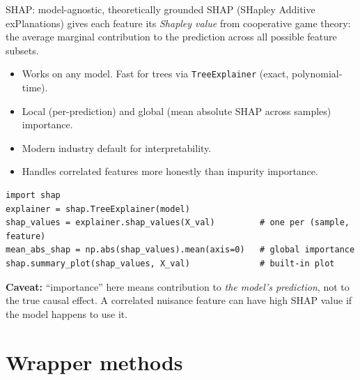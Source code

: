 \documentclass[aspectratio=169]{beamer}
\begin{document}
\begin{frame}[fragile]{SHAP: model-agnostic, theoretically grounded}
  SHAP (SHapley Additive exPlanations) gives each feature its \emph{Shapley value} from cooperative game theory: the average marginal contribution to the prediction across all possible feature subsets.
  \vfill
  \begin{itemize}\small
    \item Works on any model. Fast for trees via \texttt{TreeExplainer} (exact, polynomial-time).
    \item Local (per-prediction) and global (mean absolute SHAP across samples) importance.
    \item Modern industry default for interpretability.
    \item Handles correlated features more honestly than impurity importance.
  \end{itemize}
  \vfill
{\lstset{basicstyle=\ttfamily\scriptsize}
\begin{lstlisting}
import shap
explainer = shap.TreeExplainer(model)
shap_values = explainer.shap_values(X_val)         # one per (sample, feature)
mean_abs_shap = np.abs(shap_values).mean(axis=0)   # global importance
shap.summary_plot(shap_values, X_val)              # built-in plot
\end{lstlisting}}
  \vfill
  \footnotesize \textbf{Caveat:} ``importance'' here means contribution to \emph{the model's prediction}, not to the true causal effect. A correlated nuisance feature can have high SHAP value if the model happens to use it.
\end{frame}

\section{Wrapper methods}
\end{document}
